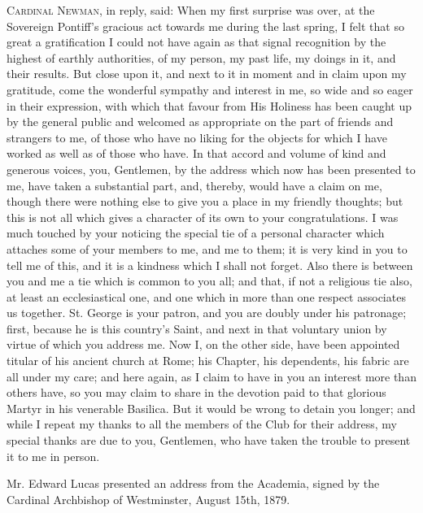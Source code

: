 C\textsc{ardinal} N\textsc{ewman},
in reply, said: When my first surprise was over, at the Sovereign
Pontiff's gracious act towards me during the last spring, I felt that
so great a gratification I could not have again as that signal
recognition by the highest of earthly authorities, of my person, my
past life, my doings in it, and their results. But close upon it, and
next to it in moment and in claim upon my gratitude, come the
wonderful sympathy and interest in me, so wide and so eager in their
expression, with which that favour from His Holiness has been caught
up by the general public and welcomed as appropriate on the part of
friends and strangers to me, of those who have no liking for the
objects for which I have worked as well as of those who have. In that
accord and volume of kind and generous voices, you, Gentlemen, by the
address which now has been presented to me, have taken a substantial
part, and, thereby, would have a claim on me, though there were
nothing else to give you a place in my friendly thoughts; but this is
not all which gives a character of its own to your congratulations. I
was much touched by your noticing the special tie of a personal
character which attaches some of your members to me, and me to them;
it is very kind in you to tell me of this, and it is a kindness which
I shall not forget. Also there is between you and me a tie which is
common to you all; and that, if not a religious tie also, at least an
ecclesiastical one, and one which in more than one respect associates
us together. St. George is your patron, and you are doubly under his
patronage; first, because he is this country's Saint, and next in that
voluntary union by virtue of which you address me. Now I, on the other
side, have been appointed titular of his ancient church at Rome; his
Chapter, his dependents, his fabric are all under my care; and here
again, as I claim to have in you an interest more than others have, so
you may claim to share in the devotion paid to that glorious Martyr in
his venerable Basilica. But it would be wrong to detain you longer;
and while I repeat my thanks to all the members of the Club for their
address, my special thanks are due to you, Gentlemen, who have taken
the trouble to present it to me in person.


Mr. Edward Lucas presented an address from the
Academia, signed by the Cardinal Archbishop of Westminster, August
15th, 1879.

